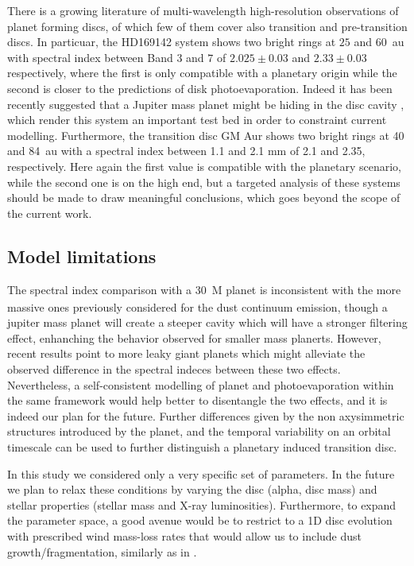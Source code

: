 \documentclass[fleqn,usenatbib]{mnras}
\begin{document}
    There is a growing literature of multi-wavelength high-resolution observations of planet forming discs, of which few of them cover also transition and pre-transition discs. 
    In particuar, the HD169142 system \citep{Macias2019} shows two bright rings at $25$ and \SI{60}{au} with spectral index between Band $3$ and $7$ of $2.025\pm0.03$ and $2.33\pm0.03$ respectively, where the first is only compatible with a planetary origin while the second is closer to the predictions of disk photoevaporation. Indeed it has been recently suggested that a Jupiter mass planet might be hiding in the disc cavity \citep{Hammond2023}, which render this system an important test bed in order to constraint current modelling.
    Furthermore, the transition disc GM Aur \citep{Huang2020} shows two bright rings at 40 and \SI{84}{au} with a spectral index between 1.1 and 2.1 mm of 2.1 and 2.35, respectively. Here again the first value is compatible with the planetary scenario, while the second one is on the high end, but a targeted analysis of these systems should be made to draw meaningful conclusions, which goes beyond the scope of the current work.

    \subsection{Model limitations}

    The spectral index comparison with a \SI{30}{M_\oplus} planet is inconsistent with the more massive ones previously considered for the dust continuum emission, though a jupiter mass planet will create a steeper cavity which will have a stronger filtering effect, enhanching the behavior observed for smaller mass planerts.
    However, recent results point to more leaky giant planets \citep[see e.g.][]{Stammler2023} which might alleviate the observed difference in the spectral indeces between these two effects.
    Nevertheless, a self-consistent modelling of planet and photoevaporation within the same framework would help better to disentangle the two effects, and it is indeed our plan for the future. Further differences given by the non axysimmetric structures introduced by the planet, and the temporal variability on an orbital timescale can be used to further distinguish a planetary induced transition disc.

    In this study we considered only a very specific set of parameters. In the future we plan to relax these conditions by varying the disc (alpha, disc mass) and stellar properties (stellar mass and X-ray luminosities). Furthermore, to expand the parameter space, a good avenue would be to restrict to a 1D disc evolution with prescribed wind mass-loss rates that would allow us to include dust growth/fragmentation, similarly as in \citet{Garate2021}.
\end{document}
